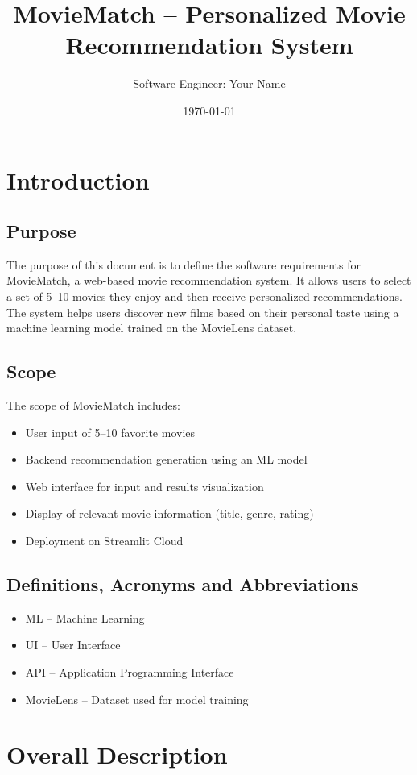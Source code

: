 \documentclass{article}
\title{MovieMatch – Personalized Movie Recommendation System}
\author{Software Engineer: Your Name}
\date{\today}
\begin{document}
\maketitle

\section{Introduction}

\subsection{Purpose}
The purpose of this document is to define the software requirements for MovieMatch, a web-based movie recommendation system. It allows users to select a set of 5–10 movies they enjoy and then receive personalized recommendations. The system helps users discover new films based on their personal taste using a machine learning model trained on the MovieLens dataset.

\subsection{Scope}
The scope of MovieMatch includes:
\begin{itemize}
    \item User input of 5–10 favorite movies
    \item Backend recommendation generation using an ML model
    \item Web interface for input and results visualization
    \item Display of relevant movie information (title, genre, rating)
    \item Deployment on Streamlit Cloud
\end{itemize}

\subsection{Definitions, Acronyms and Abbreviations}
\begin{itemize}
    \item ML – Machine Learning
    \item UI – User Interface
    \item API – Application Programming Interface
    \item MovieLens – Dataset used for model training
\end{itemize}

\section{Overall Description}
\end{document}
